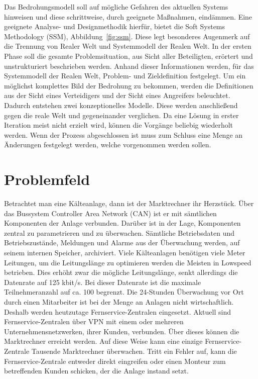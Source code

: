 \documentclass[11pt,a4paper]{report}
\begin{document}
Das Bedrohungsmodell soll auf mögliche Gefahren des aktuellen Systems hinweisen und diese schrittweise, durch geeignete Maßnahmen, eindämmen. Eine geeignete Analyse- und Designmethodik hierfür, bietet die Soft Systems Methodology (SSM), Abbildung~\ref{fig:ssm}. Diese legt besonderes Augenmerk auf die Trennung von Realer Welt und Systemmodell der Realen Welt. In der ersten Phase soll die gesamte Problemsituation, aus Sicht aller Beteiligten, erörtert und unstrukturiert beschrieben werden. Anhand dieser Informationen werden, für das Systemmodell der Realen Welt, Problem- und Zieldefinition festgelegt. Um ein möglichst komplettes Bild der Bedrohung zu bekommen, werden die Definitionen aus der Sicht eines Verteidigers und der Sicht eines Angreifers beleuchtet. Dadurch entstehen zwei konzeptionelles Modelle. Diese werden anschließend gegen die reale Welt und gegeneinander verglichen. Da eine Lösung in erster Iteration meist nicht erzielt wird, können die Vorgänge beliebig wiederholt werden. Wenn der Prozess abgeschlossen ist muss zum Schluss eine Menge an Änderungen festgelegt werden, welche vorgenommen werden sollen.

\section{Problemfeld} \label{sec:problemfeld}

Betrachtet man eine Kälteanlage, dann ist der Marktrechner ihr Herzstück. Über das Bussystem Controller Area Network (CAN) ist er mit sämtlichen Komponenten der Anlage verbunden. Darüber ist in der Lage, Komponenten zentral zu parametrieren und zu überwachen. Sämtliche Betriebsdaten und Betriebszustände, Meldungen und Alarme aus der Überwachung werden, auf seinem internen Speicher, archiviert. Viele Kälteanlagen benötigen viele Meter Leitungen, um die Leitungslänge zu optimieren werden die Meisten in Lowspeed betrieben. Dies erhöht zwar die mögliche Leitungslänge, senkt allerdings die Datenrate auf 125 kbit/s. Bei dieser Datenrate ist die maximale Teilnehmeranzahl auf ca. 100 begrenzt. Die 24-Stunden Überwachung vor Ort durch einen Mitarbeiter ist bei der Menge an Anlagen nicht wirtschaftlich. Deshalb werden heutzutage Fernservice-Zentralen eingesetzt. Aktuell sind Fernservice-Zentralen über VPN mit einem oder mehreren Unternehmensnetzwerken, ihrer Kunden, verbunden. Über dieses können die Marktrechner erreicht werden. Auf diese Weise kann eine einzige Fernservice-Zentrale Tausende Marktrechner überwachen. Tritt ein Fehler auf, kann die Fernservice-Zentrale entweder direkt eingreifen oder einen Monteur zum betreffenden Kunden schicken, der die Anlage instand setzt.
\end{document}
